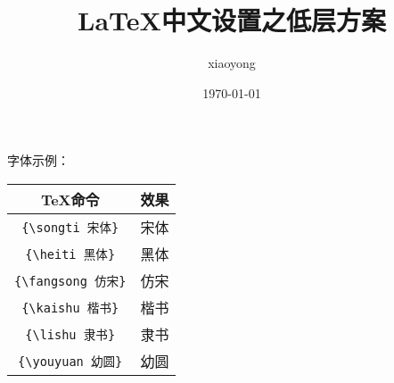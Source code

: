 \documentclass[11pt,a4paper]{article}
\title{\LaTeX 中文设置之低层方案}
\author{xiaoyong}
\date{\today}
\newcommand*{\songti}{\CJKfamily{zhsong}} %
\newcommand*{\heiti}{\CJKfamily{zhhei}}   %
\newcommand*{\kaishu}{\CJKfamily{zhkai}}  %
\newcommand*{\fangsong}{\CJKfamily{zhfs}} %
\newcommand*{\lishu}{\CJKfamily{zhli}}    %
\newcommand*{\youyuan}{\CJKfamily{zhyou}} %
\begin{document}
\maketitle
 
\begin{center}
  字体示例：\\
  \begin{tabular}{c|c}
    \hline
    \textbf{\TeX 命令} & \textbf{效果}\\
    \hline
    \verb|{\songti 宋体}| & {\songti 宋体}\\
    \hline
    \verb|{\heiti 黑体}| & {\heiti 黑体}\\
    \hline
    \verb|{\fangsong 仿宋}| & {\fangsong 仿宋}\\
    \hline
    \verb|{\kaishu 楷书}| & {\kaishu 楷书}\\
    \hline
    \verb|{\lishu 隶书}| & {\lishu 隶书}\\
    \hline
    \verb|{\youyuan 幼圆}| & {\youyuan 幼圆}\\
    \hline
  \end{tabular}
\end{center}
 
\end{document}
